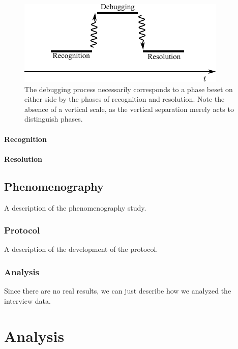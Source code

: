 \documentclass{msuphddissertation}
\begin{document}
\begin{doublespace}
\begin{figure}\centering
\includegraphics[scale=1]{./images/phases.pdf}
\caption{The debugging process necessarily corresponds to a phase beset on either side by the phases of recognition and resolution.  Note the absence of a vertical scale, as the vertical separation merely acts to distinguish phases.}\label{CH4:Phases}
\end{figure}

\subsubsection{Recognition}

\subsubsection{Resolution}

\section{Phenomenography}\label{Sec:Phenom}

A description of the phenomenography study.

\subsection{Protocol}

A description of the development of the protocol.

\subsection{Analysis}

Since there are no real results, we can just describe how we analyzed the interview data.

%
%

\chapter{Analysis}\label{CH5:Analysis}


\end{doublespace}
\end{document}
